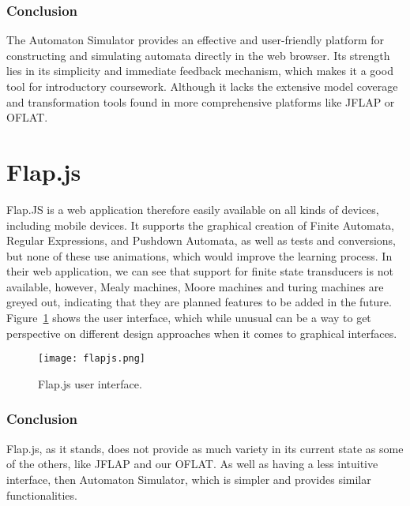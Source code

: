 \subsubsection*{Conclusion}

The Automaton Simulator provides an effective and user-friendly platform for constructing and simulating automata directly in the web browser. 
Its strength lies in its simplicity and immediate feedback mechanism, which makes it a good tool for introductory coursework.
Although it lacks the extensive model coverage and transformation tools found in more comprehensive platforms like JFLAP or OFLAT.


\section{Flap.js}
Flap.JS\cite{flapjs} is a web application therefore easily available on all kinds of devices, including mobile
devices. It supports the graphical creation of Finite Automata, Regular Expressions, and
Pushdown Automata, as well as tests and conversions, but none of these use animations, which would improve the
learning process.
In their web application, we can see that support for finite state transducers is not available, however,
Mealy machines, Moore machines and turing machines are greyed out, indicating that they are planned features to be added in the future.
Figure~\ref{fig:flapjs} shows the user interface, which while unusual can be a way to get perspective on different design approaches when it comes to graphical interfaces.

\begin{figure}[H]
  \centering
  \texttt{[image: flapjs.png]}
  \caption{Flap.js user interface.}
  \label{fig:flapjs}
\end{figure}

\subsubsection*{Conclusion}

Flap.js, as it stands, does not provide as much variety in its current state as some of the others, like JFLAP and our OFLAT. As well as having a less intuitive interface,
then Automaton Simulator, which is simpler and provides similar functionalities.

